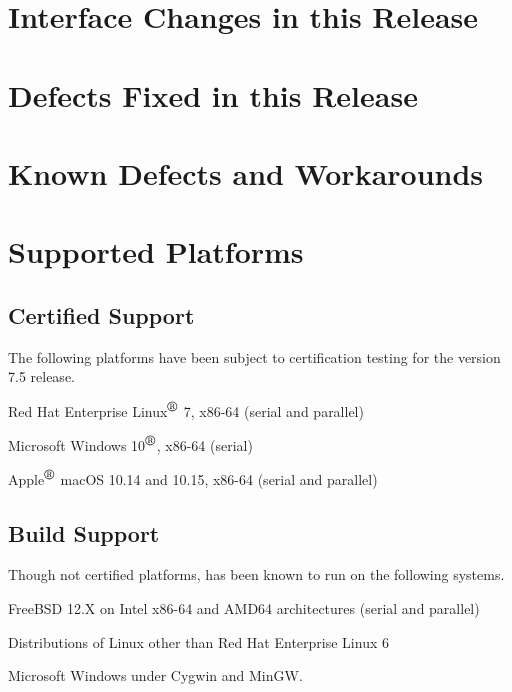 \documentclass[letterpaper]{scrartcl}
\begin{document}
\newpage
\section{Interface Changes in this Release}


\newpage
\section{Defects Fixed in this Release}


\newpage
\section{Known Defects and Workarounds}


\newpage
\section{Supported Platforms}
\subsection*{Certified Support}
The following platforms have been subject to certification testing for the
\Xyce{} version 7.5 release.
\begin{XyceItemize}
  \item Red Hat Enterprise Linux${}^{\mbox{\textregistered}}$ 7, x86-64 (serial and parallel)
  \item Microsoft Windows 10${}^{\mbox{\textregistered}}$, x86-64 (serial)
  \item Apple${}^{\mbox{\textregistered}}$ macOS 10.14 and 10.15, x86-64 (serial and parallel)
\end{XyceItemize}


\subsection*{Build Support}
Though not certified platforms, \Xyce{} has been known to run on the following
systems.
\begin{XyceItemize}
  \item FreeBSD 12.X on Intel x86-64 and AMD64 architectures (serial
    and parallel)
  \item Distributions of Linux other than Red Hat Enterprise Linux 6
  \item Microsoft Windows under Cygwin and MinGW.
\end{XyceItemize}
\end{document}
